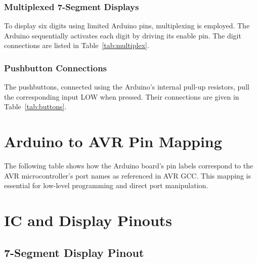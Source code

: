 \documentclass[a4paper,12pt]{article}
\begin{document}
\subsubsection{Multiplexed 7-Segment Displays}
To display six digits using limited Arduino pins, multiplexing is employed. The Arduino sequentially activates each digit by driving its enable pin. The digit connections are listed in Table~\ref{tab:multiplex}.


\subsubsection{Pushbutton Connections}
The pushbuttons, connected using the Arduino's internal pull-up resistors, pull the corresponding input LOW when pressed. Their connections are given in Table~\ref{tab:buttons}.


\section{Arduino to AVR Pin Mapping}
The following table shows how the Arduino board’s pin labels correspond to the AVR microcontroller’s port names as referenced in AVR GCC. This mapping is essential for low-level programming and direct port manipulation.


\section{IC and Display Pinouts}
\subsection{7-Segment Display Pinout}
\begin{center}

\label{fig:7seg}
\end{center}
\end{document}
